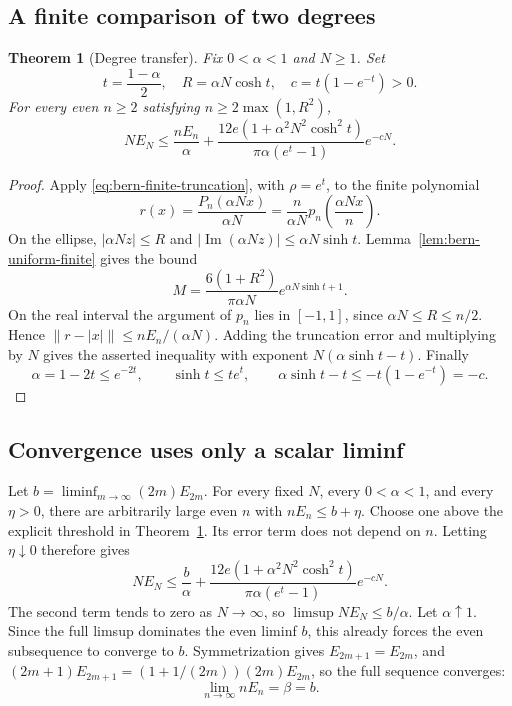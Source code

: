 \documentclass[11pt,a4paper]{article}
\newtheorem{theorem}{Theorem}[section]
\theoremstyle{definition}
\begin{document}
\subsection{A finite comparison of two degrees}
\begin{theorem}[Degree transfer]\label{thm:bern-degree-transfer}
Fix $0<\alpha<1$ and $N\ge1$. Set
\[
 t=\frac{1-\alpha}{2},\quad
 R=\alpha N\cosh t,\quad c=t(1-e^{-t})>0.
\]
For every even $n\ge2$ satisfying $n\ge2\max(1,R^2)$,
\begin{equation}
 NE_N\le\frac{nE_n}{\alpha}+
 \frac{12e(1+\alpha^2N^2\cosh^2t)}
      {\pi\alpha(e^t-1)}e^{-cN}.
 \label{eq:bern-degree-transfer}
\end{equation}
\end{theorem}
\begin{proof}
Apply \eqref{eq:bern-finite-truncation}, with $\rho=e^t$, to the
finite polynomial
\[
 r(x)=\frac{P_n(\alpha Nx)}{\alpha N}
     =\frac{n}{\alpha N}p_n\!\left(\frac{\alpha Nx}{n}\right).
\]
On the ellipse, $|\alpha Nz|\le R$ and
$|\operatorname{Im}(\alpha Nz)|\le\alpha N\sinh t$.
Lemma~\ref{lem:bern-uniform-finite} gives the bound
\[
 M=\frac{6(1+R^2)}{\pi\alpha N}
           e^{\alpha N\sinh t+1}.
\]
On the real interval the argument of $p_n$ lies in $[-1,1]$, since
$\alpha N\le R\le n/2$. Hence
$\|r-|x|\|\le nE_n/(\alpha N)$. Adding the truncation error and
multiplying by $N$ gives the asserted inequality with exponent
$N(\alpha\sinh t-t)$. Finally
\[
 \alpha=1-2t\le e^{-2t},\qquad
 \sinh t\le te^t,\qquad
 \alpha\sinh t-t\le-t(1-e^{-t})=-c.
\]
\end{proof}

\subsection{Convergence uses only a scalar liminf}
Let $b=\liminf_{m\to\infty}(2m)E_{2m}$.
For every fixed $N$, every $0<\alpha<1$, and every $\eta>0$, there are
arbitrarily large even $n$ with $nE_n\le b+\eta$.
Choose one above the explicit threshold in
Theorem~\ref{thm:bern-degree-transfer}. Its error term does not depend on
$n$. Letting $\eta\downarrow0$ therefore gives
\[
 NE_N\le\frac b\alpha+
 \frac{12e(1+\alpha^2N^2\cosh^2t)}
      {\pi\alpha(e^t-1)}e^{-cN}.
\]
The second term tends to zero as $N\to\infty$, so
$\limsup NE_N\le b/\alpha$. Let $\alpha\uparrow1$.
Since the full limsup dominates the even liminf $b$, this already forces
the even subsequence to converge to $b$. Symmetrization gives
$E_{2m+1}=E_{2m}$, and
$(2m+1)E_{2m+1}=(1+1/(2m))(2m)E_{2m}$, so the full sequence converges:
\begin{equation}
 \lim_{n\to\infty}nE_n=\beta=b.
 \label{eq:bern-limit}
\end{equation}
\end{document}
